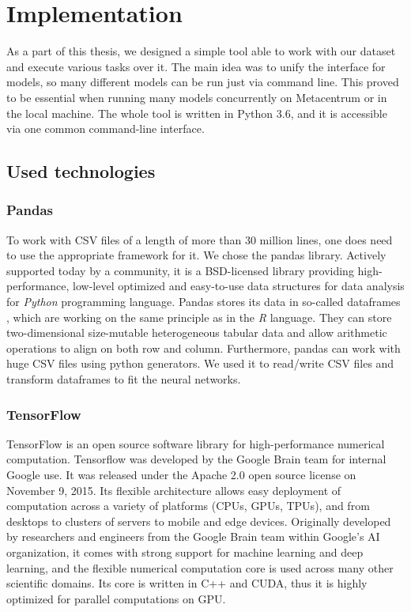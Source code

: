 \chapter{Implementation}
\label{chapter-implementation}

As a part of this thesis, we designed a simple tool able to work with our dataset and execute various tasks over it. The main idea was to unify the interface for models, so many different models can be run just via command line. This proved to be essential when running many models concurrently on Metacentrum or in the local machine. The whole tool is written in Python 3.6, and it is accessible via one common command-line interface.

\section{Used technologies}

\subsection{Pandas}

To work with CSV files of a length of more than 30 million lines, one does need to use the appropriate framework for it. We chose the pandas \cite{pandas} library. Actively supported today by a community, it is a BSD-licensed library providing high-performance, low-level optimized and easy-to-use data structures for data analysis for \textit{Python} programming language. Pandas stores its data in so-called dataframes \cite{pandas-df}, which are working on the same principle as in the \textit{R} language. They can store two-dimensional size-mutable heterogeneous tabular data and allow arithmetic operations to align on both row and column. Furthermore, pandas can work with huge CSV files using python generators. We used it to read/write CSV files and transform dataframes to fit the neural networks. 

\subsection{TensorFlow}

TensorFlow \cite{tensorflow} is an open source software library for high-performance numerical computation. Tensorflow was developed by the Google Brain team for internal Google use. It was released under the Apache 2.0 open source license on November 9, 2015. Its flexible architecture allows easy deployment of computation across a variety of platforms (CPUs, GPUs, TPUs), and from desktops to clusters of servers to mobile and edge devices. Originally developed by researchers and engineers from the Google Brain team within Google’s AI organization, it comes with strong support for machine learning and deep learning, and the flexible numerical computation core is used across many other scientific domains. Its core is written in C++ and CUDA, thus it is highly optimized for parallel computations on GPU.

